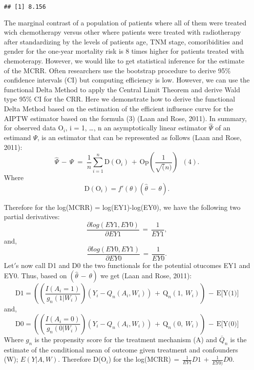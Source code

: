 \documentclass[
]{article}
\begin{document}
\begin{verbatim}
## [1] 8.156
\end{verbatim}

The marginal contrast of a population of patients where all of them were
treated wich chemotherapy versus other where patients were treated with
radiotherapy after standardizing by the levels of patients age, TNM
stage, comoribidities and gender for the one-year mortality risk is 8
times higher for patients treated with chemoterapy. However, we would
like to get statistical inference for the estimate of the MCRR. Often
researchers use the bootstrap procedure to derive 95\% confidence
intervals (CI) but computing efficiency is low. However, we can use the
functional Delta Method to apply the Central Limit Theorem and derive
Wald type 95\% CI for the CRR. Here we demonstrate how to derive the
functional Delta Method based on the estimation of the efficient
influence curve for the AIPTW estimator based on the formula (3) (Laan
and Rose, 2011). In summary, for observed data \(\text{O}_i\), i = 1,
\ldots, n an asymptotically linear estimator \(\hat\Psi\) of an estimand
\(\Psi\), is an estimator that can be represented as follows (Laan and
Rose, 2011):
\[\hat\Psi\,-\,\Psi\;=\;\frac{1}{n}\sum_{i=1}^n \text{D}(\text{O}_{i})\,+\,\text{Op}(\frac{1}{\sqrt(n)})\;\;(4).\]
Where\\
\[\text{D}(\text{O}_{i})=f'(\theta)(\hat\theta\,-\,\theta).\]

Therefore for the log(MCRR) = log(EY1)-log(EY0), we have the following
two partial derivatives:
\[\frac{\partial log(EY1,EY0)}{\partial EY1}\,=\, \frac{1}{EY1}, \] and,
\[\frac{\partial log(EY0,EY1)}{\partial EY0}\,=\, \frac{1}{EY0}. \]
Let\('\)s now call D1 and D0 the two functionals for the potential
otucomes EY1 and EY0. Thus, based on \((\hat\theta\,-\,\theta)\) we get
(Laan and Rose, 2011):
\[\text{D1} = \left(\left(\frac{I\left(A_{i}=1\right)}{g_n(1|W_{i})}\right)\left(Y_{i}-{Q}_{n}\left(A_{i},W_{i}\right)\right)\,+\,\text{Q}_{n}\left(1,\ W_{i}\right)\right)\,-\,\text{E[Y(1)]}\]
and,
\[\text{D0} = \left(\left(\frac{I\left(A_{i}=0\right)}{g_n(0|W_{i})}\right)\left(Y_{i}-{Q}_{n}\left(A_{i},W_{i}\right)\right)\,+\,\text{Q}_{n}\left(0,\ W_{i}\right)\right)\,-\,\text{E[Y(0)]}\]
Where \(g_{n}\) is the propensity score for the treatment mechanism (A)
and \(\bar Q_{n}\) is the estimate of the conditional mean of outcome
given treatment and confounders (W); \(E(Y|A,W)\). Therefore
D(\(\text{O}_{i}\)) for the
log(MCRR)\(\,=\,\frac{1}{EY1}D1\,+\,\frac{1}{EY0)}D0.\)
\end{document}
